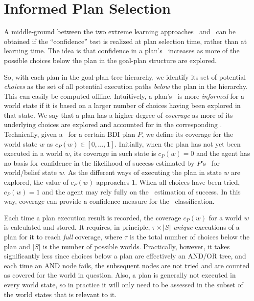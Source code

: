 \section{Informed Plan Selection}\label{sec:coverage}

A middle-ground between the two extreme learning approaches \CL\ and \BUL\ can be
obtained if the ``confidence'' test is realized at plan selection time, rather
than at learning time.
The idea is that confidence in a plan's \dt\ increases as more of the possible
choices below the plan in the goal-plan structure are explored.

So, with each plan in the goal-plan tree hierarchy, we identify its set of
potential \textit{choices} as the set of all potential execution paths
\textit{below} the plan in the hierarchy. This can easily be computed offline.
Intuitively, a plan's \dt\ is more \textit{informed} for a world state if it is
based on a larger number of choices having been explored in that state. We say
that a plan has a higher degree of \emph{coverage} as more of its underlying
choices are explored and accounted for in the corresponding \dt. Technically,
given a \dt\ for a certain BDI plan $P$, we define its coverage for the world
state $w$ as $c_P(w) \in [0,\ldots,1]$.
Initially, when the plan has not yet been executed in a world $w$, its coverage
in such state is $c_P(w) = 0$ and the agent has no basis for confidence in the
likelihood of success estimated by $P$'s \dt\ for world/belief state $w$.
As the different ways of executing the plan in state $w$ are explored, the value
of $c_P(w)$ approaches $1$. When all choices have been tried, $c_P(w)=1$ and the
agent may rely fully on the \dt\ estimation of success.
In this way, coverage can provide a confidence measure for the \dt\
classification.


Each time a plan execution result is recorded, the coverage
$c_P(w)$ for a world $w$ is calculated and stored.
It requires, in principle, $\tau \times |S|$ \emph{unique} executions of
a plan for it to reach \emph{full} coverage, where $\tau$ is the total number of
choices below the plan and $|S|$ is the number of possible worlds. Practically,
however, it takes significantly less since choices below a plan are effectively
an AND/OR tree, and each time an AND node fails, the subsequent
nodes are not tried and are counted as covered for the world in question.
Also, a plan is generally not executed in every world state, so in
practice it will only need to be assessed in the subset of the world
states that is relevant to it.






